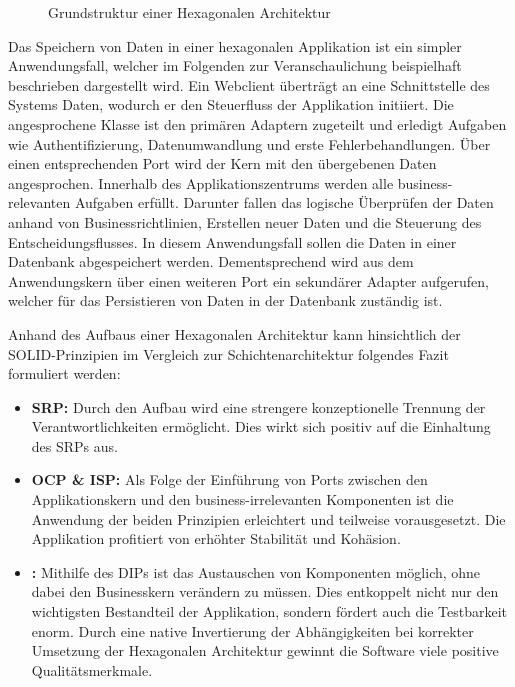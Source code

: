 
\begin{figure}[htbp]
	\centering
	
	\caption{Grundstruktur einer Hexagonalen Architektur}
	\label{fig:HexagonaleArchitektur}
\end{figure}

Das Speichern von Daten in einer hexagonalen Applikation ist ein simpler Anwendungsfall, welcher im Folgenden zur Veranschaulichung beispielhaft beschrieben dargestellt wird. Ein Webclient überträgt an eine Schnittstelle des Systems Daten, wodurch er den Steuerfluss der Applikation initiiert. Die angesprochene Klasse ist den primären Adaptern zugeteilt und erledigt Aufgaben wie Authentifizierung, Datenumwandlung und erste Fehlerbehandlungen. Über einen entsprechenden Port wird der Kern mit den übergebenen Daten angesprochen. Innerhalb des Applikationszentrums werden alle business-relevanten Aufgaben erfüllt. Darunter fallen das logische Überprüfen der Daten anhand von Businessrichtlinien, Erstellen neuer Daten und die Steuerung des Entscheidungsflusses. In diesem Anwendungsfall sollen die Daten in einer Datenbank abgespeichert werden. Dementsprechend wird aus dem Anwendungskern über einen weiteren Port ein sekundärer Adapter aufgerufen, welcher für das Persistieren von Daten in der Datenbank zuständig ist.

Anhand des Aufbaus einer Hexagonalen Architektur kann hinsichtlich der SOLID-Prinzipien im Vergleich zur Schichtenarchitektur folgendes Fazit formuliert werden:

\begin{itemize}[noitemsep,nolistsep,topsep=-2pt]
	\item \textbf{\acrshort{SRP}: } {Durch den Aufbau wird eine strengere konzeptionelle Trennung der Verantwortlichkeiten ermöglicht. Dies wirkt sich positiv auf die Einhaltung des \acrlong{SRP}s aus.}
	\item \textbf{\acrshort{OCP} \& \acrshort{ISP}: } {Als Folge der Einführung von Ports zwischen den Applikationskern und den business-irrelevanten Komponenten ist die Anwendung der beiden Prinzipien erleichtert und teilweise vorausgesetzt. Die Applikation profitiert von erhöhter Stabilität und Kohäsion. }
	\item \textbf{: } {Mithilfe des \acrlong{DIP}s ist das Austauschen von Komponenten möglich, ohne dabei den Businesskern verändern zu müssen. Dies entkoppelt nicht nur den wichtigsten Bestandteil der Applikation, sondern fördert auch die Testbarkeit enorm. Durch eine native Invertierung der Abhängigkeiten bei korrekter Umsetzung der Hexagonalen Architektur gewinnt die Software viele positive Qualitätsmerkmale.}
\end{itemize}


